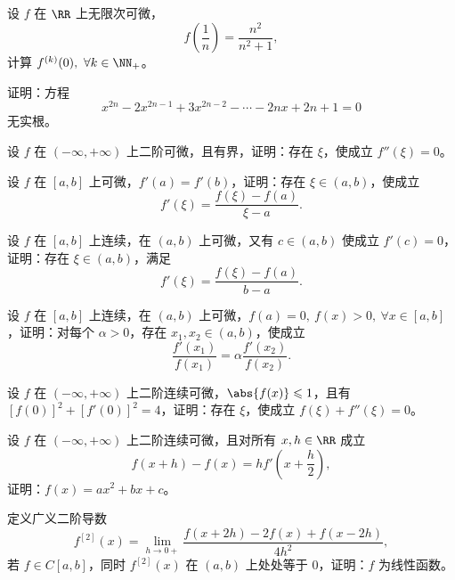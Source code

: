 \begin{xreferenceproblem}[2]
设 $f$ 在 $\RR$ 上无限次可微，
\[
  f\left(\frac1n\right)=\frac{n^2}{n^2+1},
\]
计算 $f^{(k)}(0),\ \forall k\in\NN_+$。
\end{xreferenceproblem}

\begin{xreferenceproblem}[3]
证明：方程
\[
  x^{2n}-2x^{2n-1}+3x^{2n-2}-\cdots-2nx+2n+1=0
\]
无实根。
\end{xreferenceproblem}

\begin{xreferenceproblem}[4]
设 $f$ 在 $(-\infty,+\infty)$ 上二阶可微，且有界，证明：存在 $\xi$，使成立 $f''(\xi)=0$。
\end{xreferenceproblem}

\begin{xreferenceproblem}[5]
设 $f$ 在 $[a,b]$ 上可微，$f'(a)=f'(b)$，证明：存在 $\xi\in(a,b)$，使成立
\[
  f'(\xi)=\frac{f(\xi)-f(a)}{\xi-a}.
\]
\end{xreferenceproblem}

\begin{xreferenceproblem}[6]
设 $f$ 在 $[a,b]$ 上连续，在 $(a,b)$ 上可微，又有 $c\in(a,b)$ 使成立 $f'(c)=0$，证明：存在 $\xi\in(a,b)$，满足
\[
  f'(\xi)=\frac{f(\xi)-f(a)}{b-a}.
\]
\end{xreferenceproblem}

\begin{xreferenceproblem}[7]
设 $f$ 在 $[a,b]$ 上连续，在 $(a,b)$ 上可微，$f(a)=0,\ f(x)>0,\ \forall x\in[a,b]$，证明：对每个 $\alpha>0$，存在 $x_1,x_2\in(a,b)$，使成立
\[
  \frac{f'(x_1)}{f(x_1)}=\alpha\frac{f'(x_2)}{f(x_2)}.
\]
\end{xreferenceproblem}

\begin{xreferenceproblem}[8]
设 $f$ 在 $(-\infty,+\infty)$ 上二阶连续可微，$\abs{f(x)}\leqslant1$，且有 $[f(0)]^2+[f'(0)]^2=4$，证明：存在 $\xi$，使成立 $f(\xi)+f''(\xi)=0$。
\end{xreferenceproblem}

\begin{xreferenceproblem}[9]
设 $f$ 在 $(-\infty,+\infty)$ 上二阶连续可微，且对所有 $x,h\in\RR$ 成立
\[
  f(x+h)-f(x)=hf'\left(x+\frac h2\right),
\]
证明：$f(x)=ax^2+bx+c$。
\end{xreferenceproblem}

\begin{xreferenceproblem}[10（Schwarz 定理）]
定义广义二阶导数
\[
  f^{[2]}(x)=\lim_{h\to0+}\frac{f(x+2h)-2f(x)+f(x-2h)}{4h^2},
\]
若 $f\in C[a,b]$，同时 $f^{[2]}(x)$ 在 $(a,b)$ 上处处等于 0，证明：$f$ 为线性函数。
\end{xreferenceproblem}

